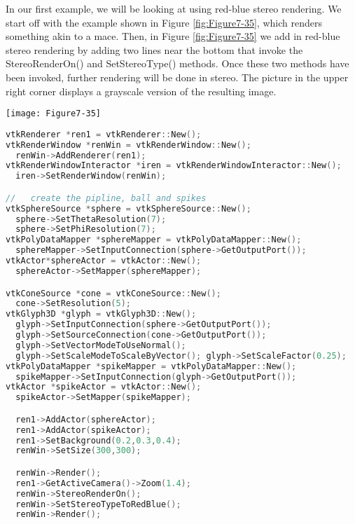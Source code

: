 \begin{minipage}[b]{0.5\linewidth}
	In our first example, we will be looking at using red-blue stereo rendering. We start off with the example shown in Figure \ref{fig:Figure7-35}, which renders something akin to a mace. Then, in Figure \ref{fig:Figure7-35} we add in red-blue stereo rendering by adding two lines near the bottom that invoke the StereoRenderOn() and SetStereoType() methods. Once these two methods have been invoked, further rendering will be done in stereo. The picture in the upper right corner displays a grayscale version of the resulting image.
\end{minipage}
\hfill
\begin{minipage}[b]{0.4\linewidth}
	\centering
	\texttt{[image: Figure7-35]}
	\label{fig:Figure7-35}
\end{minipage}

\begin{lstlisting}[language=C++, caption={An example of red-blue stereo rendering.}]
vtkRenderer *ren1 = vtkRenderer::New();
vtkRenderWindow *renWin = vtkRenderWindow::New();
  renWin->AddRenderer(ren1);
vtkRenderWindowInteractor *iren = vtkRenderWindowInteractor::New();
  iren->SetRenderWindow(renWin);

//   create the pipline, ball and spikes
vtkSphereSource *sphere = vtkSphereSource::New();
  sphere->SetThetaResolution(7);
  sphere->SetPhiResolution(7);
vtkPolyDataMapper *sphereMapper = vtkPolyDataMapper::New();
  sphereMapper->SetInputConnection(sphere->GetOutputPort());
vtkActor*sphereActor = vtkActor::New();
  sphereActor->SetMapper(sphereMapper);

vtkConeSource *cone = vtkConeSource::New();
  cone->SetResolution(5);
vtkGlyph3D *glyph = vtkGlyph3D::New();
  glyph->SetInputConnection(sphere->GetOutputPort());
  glyph->SetSourceConnection(cone->GetOutputPort());
  glyph->SetVectorModeToUseNormal();
  glyph->SetScaleModeToScaleByVector(); glyph->SetScaleFactor(0.25);
vtkPolyDataMapper *spikeMapper = vtkPolyDataMapper::New();
  spikeMapper->SetInputConnection(glyph->GetOutputPort());
vtkActor *spikeActor = vtkActor::New();
  spikeActor->SetMapper(spikeMapper);

  ren1->AddActor(sphereActor);
  ren1->AddActor(spikeActor);
  ren1->SetBackground(0.2,0.3,0.4);
  renWin->SetSize(300,300);

  renWin->Render();
  ren1->GetActiveCamera()->Zoom(1.4);
  renWin->StereoRenderOn();
  renWin->SetStereoTypeToRedBlue();
  renWin->Render();
\end{lstlisting}


